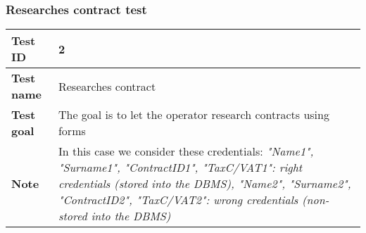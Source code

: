 {{		\subsubsection{Researches contract test}{
			\begin{table}[h]
			\begin{tabular}{|p{4cm}|p{10cm}|}
			\hline
				\centering \vspace{1mm} \bfseries{Test ID} \vspace{1mm} & 
				\vspace{1mm} 2 \vspace{1mm}\\
			\hline
				\centering \vspace{1mm} \bfseries{Test name} \vspace{1mm} & 
				\vspace{1mm} Researches contract\vspace{1mm}\\
			\hline
				\centering \vspace{1mm} \bfseries{Test goal} \vspace{1mm} & 
				\vspace{1mm} The goal is to let the operator research contracts using forms\vspace{1mm}\\
			\hline
				\centering \vspace{1mm} \bfseries{Note} \vspace{1mm} & 
				\vspace{1mm} In this case we consider these credentials: \itshape{"Name1", "Surname1", "ContractID1", "TaxC/VAT1"}: right credentials (stored into the DBMS), \itshape{"Name2", "Surname2", "ContractID2", "TaxC/VAT2"}: wrong credentials (non-stored into the DBMS) \vspace{1mm}\\
			\hline
			\end{tabular}
			\end{table}

}}}
